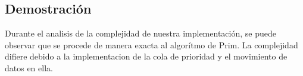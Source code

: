 \subsection{Demostración}

Durante el analisis de la complejidad de nuestra implementación, se puede observar que se procede de manera exacta al algorítmo de Prim. La complejidad difiere debido a la implementacion de la cola de prioridad y el movimiento de datos en ella.
